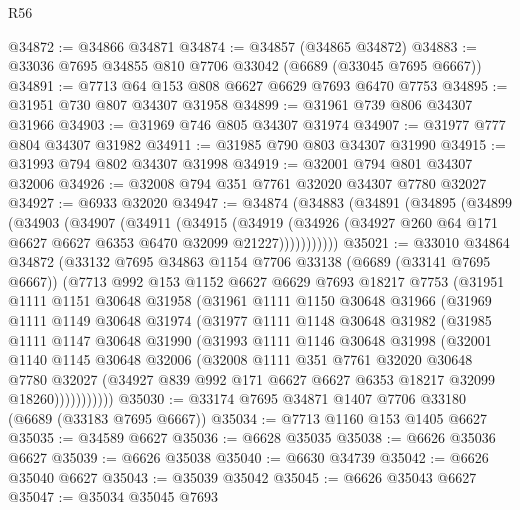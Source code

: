 \begin{lexlean}{R56}
\begin{coremodule}
@34872 := @34866 @34871
@34874 := @34857 (@34865 @34872)
@34883 := @33036 @7695 @34855 @810 @7706 @33042 (@6689 (@33045 @7695 @6667))
@34891 := @7713 @64 @153 @808 @6627 @6629 @7693 @6470 @7753
@34895 := @31951 @730 @807 @34307 @31958
@34899 := @31961 @739 @806 @34307 @31966
@34903 := @31969 @746 @805 @34307 @31974
@34907 := @31977 @777 @804 @34307 @31982
@34911 := @31985 @790 @803 @34307 @31990
@34915 := @31993 @794 @802 @34307 @31998
@34919 := @32001 @794 @801 @34307 @32006
@34926 := @32008 @794 @351 @7761 @32020 @34307 @7780 @32027
@34927 := @6933 @32020
@34947 := @34874
    (@34883
      (@34891
        (@34895
          (@34899
            (@34903
              (@34907
                (@34911
                  (@34915
                    (@34919
                      (@34926 (@34927 @260 @64 @171 @6627 @6627 @6353 @6470 @32099 @21227)))))))))))
@35021 := @33010
    @34864
    @34872
    (@33132
      @7695
      @34863
      @1154
      @7706
      @33138
      (@6689 (@33141 @7695 @6667))
      (@7713
        @992
        @153
        @1152
        @6627
        @6629
        @7693
        @18217
        @7753
        (@31951
          @1111
          @1151
          @30648
          @31958
          (@31961
            @1111
            @1150
            @30648
            @31966
            (@31969
              @1111
              @1149
              @30648
              @31974
              (@31977
                @1111
                @1148
                @30648
                @31982
                (@31985
                  @1111
                  @1147
                  @30648
                  @31990
                  (@31993
                    @1111
                    @1146
                    @30648
                    @31998
                    (@32001
                      @1140
                      @1145
                      @30648
                      @32006
                      (@32008
                        @1111
                        @351
                        @7761
                        @32020
                        @30648
                        @7780
                        @32027
                        (@34927 @839 @992 @171 @6627 @6627 @6353 @18217 @32099 @18260)))))))))))
@35030 := @33174 @7695 @34871 @1407 @7706 @33180 (@6689 (@33183 @7695 @6667))
@35034 := @7713 @1160 @153 @1405 @6627
@35035 := @34589 @6627
@35036 := @6628 @35035
@35038 := @6626 @35036 @6627
@35039 := @6626 @35038
@35040 := @6630 @34739
@35042 := @6626 @35040 @6627
@35043 := @35039 @35042
@35045 := @6626 @35043 @6627
@35047 := @35034 @35045 @7693

\end{coremodule}
\end{lexlean}
